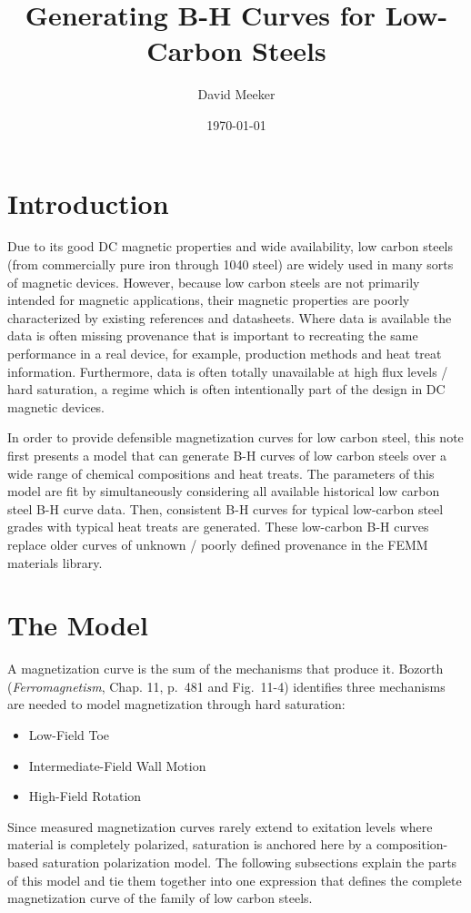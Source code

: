 \documentclass[
  11pt,
]{article}
\title{Generating B-H Curves for Low-Carbon Steels}
\author{David Meeker}
\date{\today}
\begin{document}
\maketitle

\section{Introduction}\label{introduction}

Due to its good DC magnetic properties and wide availability, low carbon steels (from commercially pure iron through 1040 steel) are widely used in many sorts of magnetic devices.  However, because low carbon steels are not primarily intended for magnetic applications, their magnetic properties are poorly characterized by existing references and datasheets.  Where data is available the data is often missing provenance that is important to recreating the same performance in a real device, for example, production methods and heat treat information.  Furthermore, data is often totally unavailable at high flux levels / hard saturation, a regime which is often intentionally part of the design in DC magnetic devices.

In order to provide defensible magnetization curves for low carbon steel, this note first presents a model that can generate B-H curves of low carbon steels over a wide range of chemical compositions and heat treats.  The parameters of this model are fit by simultaneously considering all available historical low carbon steel B-H curve data.  Then, consistent B-H curves for typical low-carbon steel grades with typical heat treats are generated.  These low-carbon B-H curves replace older curves of unknown / poorly defined provenance in the FEMM materials library.

\section{The Model}\label{the-model}

A magnetization curve is the sum of the mechanisms that produce it. Bozorth\cite{bozorth1951} (\emph{Ferromagnetism}, Chap. 11, p.~481 and Fig.~11-4) identifies three mechanisms are needed to model magnetization through hard saturation:
\begin{itemize}
\item Low-Field Toe
\item Intermediate-Field Wall Motion
\item High-Field Rotation
\end{itemize}
Since measured magnetization curves rarely extend to exitation levels where material is completely polarized, saturation is anchored here by a composition-based saturation polarization model.  The following subsections explain the parts of this model and tie them together into one expression that defines the complete magnetization curve of the family of low carbon steels.
\end{document}
